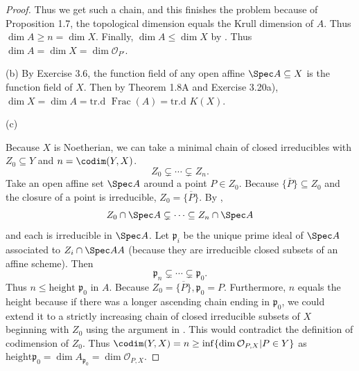 \begin{proof}
	Thus we get such a chain, and this finishes the problem because of Proposition 1.7, the topological dimension equals the Krull dimension of $A $.
	Thus $\dim A \ge n = \dim X $.
	Finally, $\dim A \le \dim X $ by .
	Thus $\dim A = \dim X = \dim \mathcal{O}_{P'} $.

	(b) By Exercise 3.6, the function field of any open affine $\Spec A \subseteq X $ is the function field of $X $.
	Then by Theorem 1.8A and Exercise 3.20a), $\dim X = \dim A = \text{tr.d } \operatorname{Frac}(A) = \text{tr.d } K(X)$.

	(c)

	Because $X $ is Noetherian, we can take a minimal chain of closed irreducibles with $Z_{0} \subseteq Y $ and $n = \codim(Y,X) $.
	\[
		Z_{0} \subsetneq \cdots \subsetneq Z_n
	.\]
	Take an open affine set $\Spec A $ around a point $P\in Z_{0} $.
	Because $\overline{\{P\}  } \subseteq Z_{0}  $ and the closure of a point is irreducible, $Z_{0} = \overline{\{P\}  }  $.
	By ,
	\[
		Z_{0}\cap \Spec A \subsetneq \cdots \subseteq Z_n \cap \Spec A
	\]
	and each is irreducible in $\Spec A $.
	Let $\mathfrak{p}_i $ be the unique prime ideal of $\Spec A $ associated to $Z_i \cap \Spec AA$ (because they are irreducible closed subsets of an affine scheme).
	Then
	\[
		\mathfrak{p}_n \subsetneq \cdots \subsetneq \mathfrak{p}_0
	.\]
	Thus $n \le \text{height }\mathfrak{p}_0$ in $A $.
	Because $Z_{0} = \overline{\{P\}  }, \mathfrak{p}_0 = P  $.
	Furthermore, $n $ equals the height because if there was a longer ascending chain ending in $\mathfrak{p}_0 $, we could extend it to a strictly increasing chain of closed irreducible subsets of $X $ beginning with $Z_{0}$ using the argument in .
	This would contradict the definition of codimension of $Z_{0}$.
	Thus $\codim(Y,X) = n \ge \inf \{\dim \mathcal{O}_{P,X}| P\in Y\}   $ as $\text{height} \mathfrak{p}_0 = \dim A_{\mathfrak{p}_0} = \dim \mathcal{O}_{P,X} $.


\end{proof}
